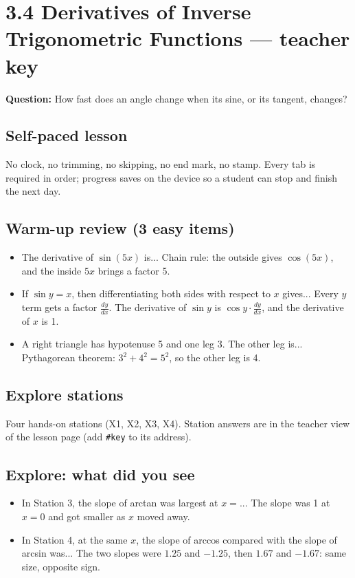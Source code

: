 \documentclass[11pt]{article}
\begin{document}
\section*{3.4 Derivatives of Inverse Trigonometric Functions --- teacher key}
\textbf{Question:} How fast does an angle change when its sine, or its tangent, changes?\par
\subsection*{Self-paced lesson}No clock, no trimming, no skipping, no end mark, no stamp. Every tab is required in order; progress saves on the device so a student can stop and finish the next day.\par
\subsection*{Warm-up review (3 easy items)}\begin{itemize}
\item The derivative of $\sin(5x)$ is...  Chain rule: the outside gives $\cos(5x)$, and the inside $5x$ brings a factor 5.
\item If $\sin y = x$, then differentiating both sides with respect to $x$ gives...  Every $y$ term gets a factor $\tfrac{dy}{dx}$. The derivative of $\sin y$ is $\cos y\cdot\tfrac{dy}{dx}$, and the derivative of $x$ is 1.
\item A right triangle has hypotenuse 5 and one leg 3. The other leg is...  Pythagorean theorem: $3^2+4^2=5^2$, so the other leg is 4.
\end{itemize}
\subsection*{Explore stations}Four hands-on stations (X1, X2, X3, X4). Station answers are in the teacher view of the lesson page (add \texttt{\#key} to its address).\par
\subsection*{Explore: what did you see}\begin{itemize}
\item In Station 3, the slope of arctan was largest at $x=$...  The slope was 1 at $x=0$ and got smaller as $x$ moved away.
\item In Station 4, at the same $x$, the slope of arccos compared with the slope of arcsin was...  The two slopes were $1.25$ and $-1.25$, then $1.67$ and $-1.67$: same size, opposite sign.
\end{itemize}
\end{document}

